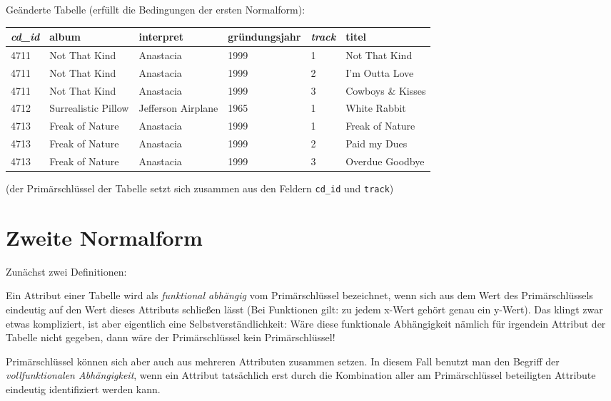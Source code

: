 \begin{minipage}{1.0\textwidth}
Geänderte Tabelle (erfüllt die Bedingungen der ersten Normalform):

\begin{center}
\begin{tabular}{|l|l|l|l|l|l|}\hline
\textbf{\em cd\_id} & \textbf{album} & \textbf{interpret} &
\textbf{gründungsjahr} & \textbf{\em track} & \textbf{titel}\\ \hline
4711 & Not That Kind & Anastacia & 1999 & 1 & Not That Kind\\ \hline
4711 & Not That Kind & Anastacia & 1999 & 2 & I’m Outta Love\\ \hline
4711 & Not That Kind & Anastacia & 1999 & 3 & Cowboys \& Kisses\\ \hline
4712 & Surrealistic Pillow & Jefferson Airplane & 1965 & 1 & White Rabbit\\
\hline
4713 & Freak of Nature & Anastacia & 1999 & 1 & Freak of Nature\\ \hline
4713 & Freak of Nature & Anastacia & 1999 & 2 & Paid my Dues\\ \hline
4713 & Freak of Nature & Anastacia & 1999 & 3 & Overdue Goodbye\\ \hline
\end{tabular}
\end{center}
\end{minipage}

(der Primärschlüssel der Tabelle setzt sich zusammen aus den Feldern
\lstinline|cd_id| und \lstinline|track|)


\section{Zweite Normalform}

Zunächst zwei Definitionen:

Ein Attribut einer Tabelle wird als \emph{funktional abhängig} vom
Primärschlüssel bezeichnet, wenn sich aus dem Wert des Primärschlüssels
eindeutig auf den Wert dieses Attributs schließen lässt (Bei Funktionen gilt: zu
jedem x-Wert gehört genau ein y-Wert). Das klingt zwar etwas kompliziert, ist
aber eigentlich eine Selbstverständlichkeit: Wäre diese funktionale
Abhängigkeit nämlich für irgendein Attribut der Tabelle nicht gegeben, dann
wäre der Primärschlüssel kein Primärschlüssel!

Primärschlüssel können sich aber auch aus mehreren Attributen zusammen setzen.
In diesem Fall benutzt man den Begriff der \emph{vollfunktionalen
Abhängigkeit}, wenn ein Attribut tatsächlich erst durch die Kombination aller am
Primärschlüssel beteiligten Attribute eindeutig identifiziert werden kann.

